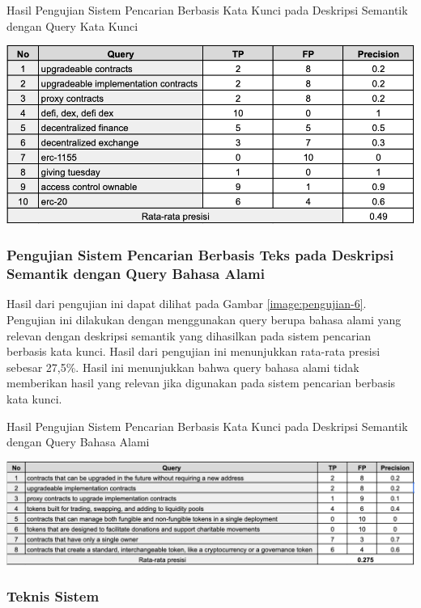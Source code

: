 \begin{table}[ht]
	\centering
	\caption{Hasil Pengujian Sistem Pencarian Berbasis Kata Kunci pada Deskripsi Semantik dengan Query Kata Kunci}
	\includegraphics[width=1\textwidth]{resources/chapter-4/data-1-5.png}
	\label{image:pengujian-5}
\end{table}

\subsubsection{Pengujian Sistem Pencarian Berbasis Teks pada Deskripsi Semantik dengan Query Bahasa Alami}

Hasil dari pengujian ini dapat dilihat pada Gambar \ref{image:pengujian-6}. Pengujian ini dilakukan dengan menggunakan query berupa bahasa alami yang relevan dengan deskripsi semantik yang dihasilkan pada sistem pencarian berbasis kata kunci. Hasil dari pengujian ini menunjukkan rata-rata presisi sebesar 27,5\%. Hasil ini menunjukkan bahwa query bahasa alami tidak memberikan hasil yang relevan jika digunakan pada sistem pencarian berbasis kata kunci.

\begin{table}[ht]
	\centering
	\caption{Hasil Pengujian Sistem Pencarian Berbasis Kata Kunci pada Deskripsi Semantik dengan Query Bahasa Alami}
	\includegraphics[width=1\textwidth]{resources/chapter-4/data-1-6.png}
	\label{image:pengujian-6}
\end{table}

\subsubsection{Teknis Sistem}
\label{subsec:teknis-sistem}

